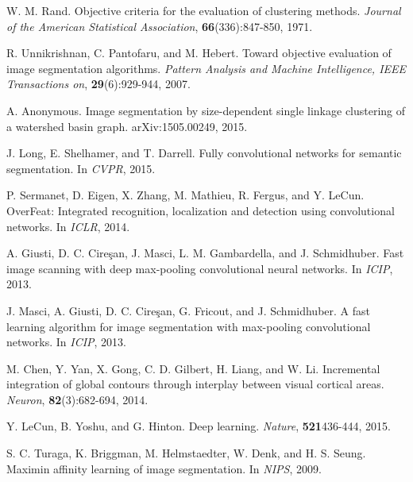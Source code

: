 \documentclass{article} %
\begin{document}
\begin{thebibliography}{9}
{
W. M. Rand. Objective criteria for the evaluation of clustering methods. {\it Journal of the American Statistical Association}, {\bf 66}(336):847-850, 1971.

R. Unnikrishnan, C. Pantofaru, and M. Hebert. Toward objective evaluation of image segmentation algorithms. {\it Pattern Analysis and Machine Intelligence, IEEE Transactions on}, {\bf 29}(6):929-944, 2007.

A. Anonymous. Image segmentation by size-dependent single linkage clustering of a watershed basin graph. arXiv:1505.00249, 2015.

J. Long, E. Shelhamer, and T. Darrell. Fully convolutional networks for semantic segmentation. In {\it CVPR}, 2015.

P. Sermanet, D. Eigen, X. Zhang, M. Mathieu, R. Fergus, and Y. LeCun. OverFeat: Integrated recognition, localization and detection using convolutional networks. In {\it ICLR}, 2014.

A. Giusti, D. C. Cire\c{s}an, J. Masci, L. M. Gambardella, and J. Schmidhuber. Fast image scanning with deep
max-pooling convolutional neural networks. In {\it ICIP}, 2013.

J. Masci, A. Giusti, D. C. Cire\c{s}an, G. Fricout, and J. Schmidhuber. A fast learning algorithm for image segmentation with max-pooling convolutional networks. In {\it ICIP}, 2013.



M. Chen, Y. Yan, X. Gong, C. D. Gilbert, H. Liang, and W. Li. Incremental integration of global contours through interplay between visual cortical areas. {\it Neuron}, {\bf 82}(3):682-694, 2014.

Y. LeCun, B. Yoshu, and G. Hinton. Deep learning. {\it Nature}, {\bf 521}436-444, 2015.

S. C. Turaga, K. Briggman, M. Helmstaedter, W. Denk, and H. S. Seung. Maximin affinity learning of image segmentation. In {\it NIPS}, 2009.

}
\end{thebibliography}
\endgroup


\end{document}
